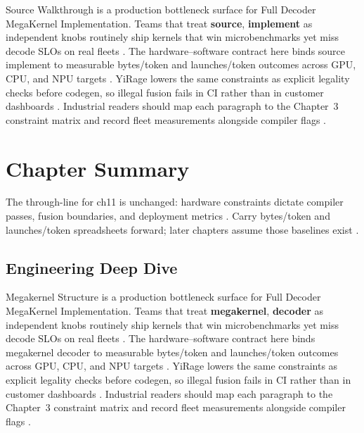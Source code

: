 Source Walkthrough is a production bottleneck surface for Full Decoder MegaKernel Implementation. Teams that treat \textbf{source}, \textbf{implement} as independent knobs routinely ship kernels that win microbenchmarks yet miss decode SLOs on real fleets \citep{nvidia2022hopper,amd2024aie}. The hardware--software contract here binds source implement to measurable bytes/token and launches/token outcomes across GPU, CPU, and NPU targets \citep{semianalysis2024tma,dlbook}. YiRage lowers the same constraints as explicit legality checks before codegen, so illegal fusion fails in CI rather than in customer dashboards \citep{amd2024xdna,dao2022flashattention}. Industrial readers should map each paragraph to the Chapter~3 constraint matrix and record fleet measurements alongside compiler flags \citep{amd2024aie,kwon2023vllm}.

\section{Chapter Summary}
\label{sec:ch11_summary}

The through-line for ch11 is unchanged: hardware constraints dictate compiler passes, fusion boundaries, and deployment metrics \citep{memoryfloor2026,amd2024xdna}. Carry bytes/token and launches/token spreadsheets forward; later chapters assume those baselines exist \citep{semianalysis2024tma,dlbook}.


\subsection{Engineering Deep Dive}
\label{sec:ch11_deep_dive}

Megakernel Structure is a production bottleneck surface for Full Decoder MegaKernel Implementation. Teams that treat \textbf{megakernel}, \textbf{decoder} as independent knobs routinely ship kernels that win microbenchmarks yet miss decode SLOs on real fleets \citep{semianalysis2024tma,dlbook}. The hardware--software contract here binds megakernel decoder to measurable bytes/token and launches/token outcomes across GPU, CPU, and NPU targets \citep{amd2024xdna,dao2022flashattention}. YiRage lowers the same constraints as explicit legality checks before codegen, so illegal fusion fails in CI rather than in customer dashboards \citep{amd2024aie,kwon2023vllm}. Industrial readers should map each paragraph to the Chapter~3 constraint matrix and record fleet measurements alongside compiler flags \citep{dlbook,nvidia2024cudagraphs}.

